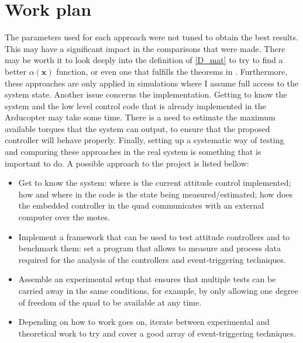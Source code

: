 \documentclass{article}
\begin{document}
	\section{Work plan}
		The parameters used for each approach were not tuned to obtain the best results. This may have a significant impact in the comparisons that were made. There may be worth it to look deeply into the definition of \eqref{D_mat} to try to find a better $\alpha(\mathbf{x})$ function, or even one that fulfills the theorems in \cite{tabuada_event_control}. Furthermore, these approaches are only applied in simulations where I assume full access to the system state. Another issue concerns the implementation. Getting to know the system and the low level control code that is already implemented in the Arducopter may take some time. There is a need to estimate the maximum available torques that the system can output, to ensure that the proposed controller will behave properly. Finally, setting up a systematic way of testing and comparing these approaches in the real system is something that is important to do. A possible approach to the project is listed bellow:
		\begin{itemize}
			\item Get to know the system: where is the current attitude control implemented; how and where in the code is the state being measured/estimated; how does the embedded controller in the quad communicates with an external computer over the motes.
			\item Implement a framework that can be used to test attitude controllers and to benchmark them: set a program that allows to measure and process data required for the analysis of the controllers and event-triggering techniques.
			\item Assemble an experimental setup that ensures that multiple tests can be carried away in the same conditions, for example, by only allowing one degree of freedom of the quad to be available at any time.
			\item Depending on how to work goes on, iterate between experimental and theoretical work to try and cover a good array of event-triggering techniques.
		\end{itemize}
		
	
\end{document}
